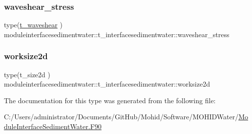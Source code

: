 \subsubsection{\texorpdfstring{waveshear\+\_\+stress}{waveshear\_stress}}
{\footnotesize\ttfamily type(\mbox{\hyperlink{structmoduleinterfacesedimentwater_1_1t__waveshear}{t\+\_\+waveshear}} ) moduleinterfacesedimentwater\+::t\+\_\+interfacesedimentwater\+::waveshear\+\_\+stress\hspace{0.3cm}{\ttfamily [private]}}

\mbox{\label{structmoduleinterfacesedimentwater_1_1t__interfacesedimentwater_a8868c7c56fc1de55d3db51aabb8e5444}} 
\subsubsection{\texorpdfstring{worksize2d}{worksize2d}}
{\footnotesize\ttfamily type(t\+\_\+size2d ) moduleinterfacesedimentwater\+::t\+\_\+interfacesedimentwater\+::worksize2d\hspace{0.3cm}{\ttfamily [private]}}



The documentation for this type was generated from the following file\+:\begin{DoxyCompactItemize}
\item 
C\+:/\+Users/administrator/\+Documents/\+Git\+Hub/\+Mohid/\+Software/\+M\+O\+H\+I\+D\+Water/\mbox{\hyperlink{_module_interface_sediment_water_8_f90}{Module\+Interface\+Sediment\+Water.\+F90}}\end{DoxyCompactItemize}
